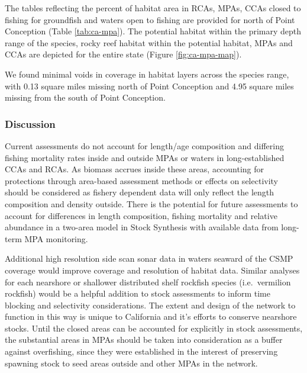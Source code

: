 \documentclass[11pt,
  english,
  letterpaper,
]{article}
\begin{document}
The tables reflecting the percent of habitat area in RCAs, MPAs, CCAs closed to fishing for groundfish and waters open to fishing are provided for north of Point Conception (Table \ref{tab:ca-mpa}). The potential habitat within the primary depth range of the species, rocky reef habitat within the potential habitat, MPAs and CCAs are depicted for the entire state (Figure \ref{fig:ca-mpa-map}).

\leavevmode\tagmcend\tagstructend\par


We found minimal voids in coverage in habitat layers across the species range, with 0.13 square miles missing north of Point Conception and 4.95 square miles missing from the south of Point Conception.

\leavevmode\tagmcend\tagstructend\par


\hypertarget{discussion}{%
\subsubsection{Discussion}\label{discussion}}

\leavevmode\tagmcend\tagstructend


Current assessments do not account for length/age composition and differing fishing mortality rates inside and outside MPAs or waters in long-established CCAs and RCAs. As biomass accrues inside these areas, accounting for protections through area-based assessment methods or effects on selectivity should be considered as fishery dependent data will only reflect the length composition and density outside. There is the potential for future assessments to account for differences in length composition, fishing mortality and relative abundance in a two-area model in Stock Synthesis with available data from long-term MPA monitoring.

\leavevmode\tagmcend\tagstructend\par


Additional high resolution side scan sonar data in waters seaward of the CSMP coverage would improve coverage and resolution of habitat data. Similar analyses for each nearshore or shallower distributed shelf rockfish species (i.e.~vermilion rockfish) would be a helpful addition to stock assessments to inform time blocking and selectivity considerations. The extent and design of the network to function in this way is unique to California and it's efforts to conserve nearshore stocks. Until the closed areas can be accounted for explicitly in stock assessments, the substantial areas in MPAs should be taken into consideration as a buffer against overfishing, since they were established in the interest of preserving spawning stock to seed areas outside and other MPAs in the network.
\end{document}
